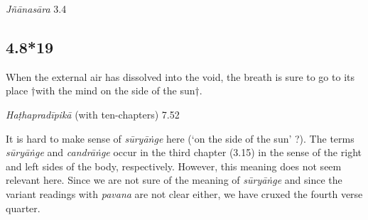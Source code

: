 \begin{ekdosis}
\begin{sources}[hp04_008_18]
\emph{Jñānasāra} 3.4
\begin{versinnote}
\end{versinnote}

\end{sources}



\subsection*{4.8*19}
\begin{translation}[hp04_008_19]
When the external air has dissolved into the void, the breath is sure to go to its place †with the mind on the side of the sun†.
\end{translation}


\begin{testimonia}[hp04_008_19]
\emph{Haṭhapradīpikā} (with ten-chapters) 7.52 
\begin{versinnote}
\end{versinnote}
\end{testimonia}

\begin{philcomm}[hp04_008_19]
It is hard to make sense of \emph{sūryāṅge} here (`on the side of the sun' ?). The terms \emph{sūryāṅge} and \emph{candrāṅge} occur in the third chapter (3.15) in the sense of the right and left sides of the body, respectively. However, this meaning does not seem relevant here. Since we are not sure of the meaning of \emph{sūryāṅge} and since the variant readings with \emph{pavana} are not clear either, we have cruxed the fourth verse quarter.      


\end{philcomm}
\end{ekdosis}
